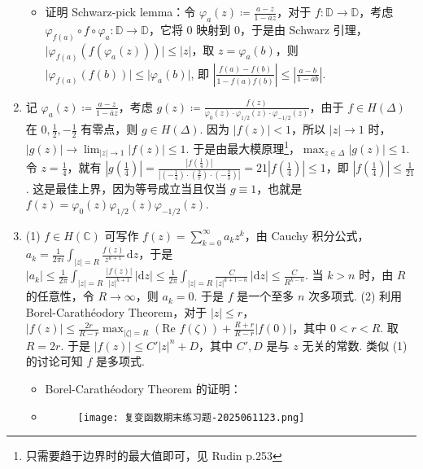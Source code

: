 \begin{enumerate}
	\begin{itemize}
		\item 证明 Schwarz-pick lemma：令 $\varphi_{a}(z)\coloneqq\frac{a-z}{1-\overline{a}z}$，对于 $f:\mathbb{D}\to \mathbb{D}$，考虑 $\varphi_{f(a)}\circ f\circ\varphi_{a}:\mathbb{D}\to \mathbb{D}$，它将 0 映射到 0，于是由 Schwarz 引理，$\lvert \varphi_{f(a)}(f(\varphi_{a}(z))) \rvert\leq \lvert z \rvert$，取 $z=\varphi_{a}(b)$，则 $\lvert \varphi_{f(a)}(f(b)) \rvert\leq \lvert \varphi_{a}(b) \rvert$, 即 $\left\lvert  \frac{f(a)-f(b)}{1-\overline{f(a)}f(b)}  \right\rvert\leq \left\lvert  \frac{a-b}{1-\overline{a}b}  \right\rvert$.
	\end{itemize}
	\item 记 $\varphi_{a}(z)\coloneqq\frac{a-z}{1-\overline{a}z}$，考虑 $g(z)\coloneqq\frac{f(z)}{\varphi_{0}(z)\cdot\varphi_{1/2}(z)\cdot\varphi_{-1/2}(z)}$，由于 $f\in H(\Delta)$ 在 $0,\frac{1}{2},-\frac{1}{2}$ 有零点，则 $g\in H(\Delta)$. 因为 $\lvert f(z) \rvert<1$，所以 $\lvert z \rvert\to1$ 时，$\lvert g(z) \rvert\to \lim_{ \lvert z \rvert \to 1 }\lvert f(z) \rvert\leq1$. 于是由最大模原理\footnote{只需要趋于边界时的最大值即可，见 Rudin p.253}，$\max_{z\in\Delta}\lvert g(z) \rvert\leq1$. 令 $z=\frac{1}{4}$，就有 $\left\lvert  g\left( \frac{1}{4} \right)  \right\rvert=\frac{\left\lvert  f\left( \frac{1}{4} \right)  \right\rvert}{\left\lvert  \left( -\frac{1}{4} \right)\cdot\left( \frac{2}{7} \right)\cdot\left( -\frac{2}{3} \right)  \right\rvert}=21\left\lvert  f\left( \frac{1}{4} \right)  \right\rvert\leq1$，即 $\left\lvert  f\left( \frac{1}{4} \right)  \right\rvert\leq\frac{1}{21}$. 这是最佳上界，因为等号成立当且仅当 $g\equiv1$，也就是 $f(z)=\varphi_{0}(z)\varphi_{1/2 }(z)\varphi_{-1/2 }(z)$.
	\item (1) $f\in H(\mathbb{C})$ 可写作 $f(z)=\sum_{k=0}^{\infty}a_kz^{k}$，由 Cauchy 积分公式，$a_k=\frac{1}{2\pi i}\int_{\lvert z \rvert=R}^{} \frac{f(z)}{z^{k+1}} \, \mathrm{d}z$，于是 $\lvert a_k \rvert\leq\frac{1}{2\pi}\int_{\lvert z \rvert=R}^{} \frac{\lvert f(z) \rvert}{\lvert z \rvert ^{k+1}} \, \lvert \mathrm{d}z \rvert\leq\frac{1}{2\pi}\int_{\lvert z \rvert=R}^{} \frac{C}{\lvert z \rvert ^{k+1-n}} \, \lvert \mathrm{d}z \rvert\leq\frac{C}{R^{k-n}}$. 当 $k>n$ 时，由 $R$ 的任意性，令 $R\to \infty$，则 $a_k=0$. 于是 $f$ 是一个至多 $n$ 次多项式. (2) 利用 Borel-Carathéodory Theorem，对于 $\lvert z \rvert\leq r$，$\lvert f(z) \rvert\leq\frac{2r}{R-r}\max_{\lvert \zeta \rvert=R}(\text{Re }f(\zeta))+\frac{R+r}{R-r}\lvert f(0) \rvert$，其中 $0<r<R$. 取 $R=2r$. 于是 $\lvert f(z) \rvert\leq C'\lvert z \rvert ^{n}+D$，其中 $C',D$ 是与 $z$ 无关的常数. 类似 (1) 的讨论可知 $f$ 是多项式.
	\begin{itemize}
		\item Borel-Carathéodory Theorem 的证明：
		\item \begin{figure}[H]
\centering
\texttt{[image: 复变函数期末练习题-2025061123.png]}
\label{}
\end{figure}
	\end{itemize}
\end{enumerate}
